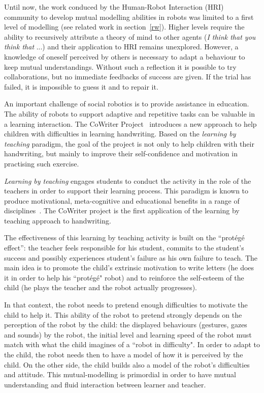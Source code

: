 \documentclass[conference]{IEEEtran}
\begin{document}
Until now, the work conduced by the Human-Robot Interaction (HRI) community to develop mutual modelling abilities in robots was limited to a first level of modelling (see related work in section~\ref{rw}). Higher levels require the ability to recursively attribute a theory of mind to other agents (\textit{I think that you think that} ...) and their application to HRI remains unexplored. However, a knowledge of oneself perceived by others is necessary to adapt a behaviour to keep mutual understandings. 
Without such a reflection it is possible to try collaborations, but no immediate feedbacks of success are given. If the trial has failed, it is impossible to guess it and to repair it. 


An important challenge of social robotics is to provide assistance in education. 
The ability of robots to support adaptive and repetitive tasks can be valuable in a learning interaction.
The CoWriter Project~\cite{Hood,jacq2016building} introduces a new approach to help children with difficulties in learning handwriting. 
Based on the \emph{learning by teaching} paradigm, the goal of the project is not only to help children with their handwriting, but mainly to improve their self-confidence and motivation in practising such exercise.

\emph{Learning by teaching} engages students to conduct the activity in the role of the teachers in order to support their learning process. 
This  paradigm is known to produce motivational, meta-cognitive and educational benefits in a range of disciplines~\cite{Rohrbeck2003}. 
The CoWriter project is the first application of the learning by teaching approach to handwriting.

The effectiveness of this learning by teaching activity is built on the ``prot\'eg\'e effect'': the teacher feels responsible for his student, commits to the student's success and possibly experiences student's failure as his own failure to teach. 
The main idea is to promote the child's extrinsic motivation to write letters (he does it in order to help his ``prot\'eg\'e" robot) and to reinforce the self-esteem of the child (he plays the teacher and the robot actually progresses).

In that context, the robot needs to pretend enough difficulties to motivate the child to help it. 
This ability of the robot to pretend strongly depends on the perception of the robot by the child: the displayed behaviours (gestures, gazes and sounds) by the robot, the initial level and learning speed of the robot must match with what the child imagines of a ``robot in difficulty".
In order to adapt to the child, the robot needs then to have a model of how it is perceived by the child. On the other side, the child builds also a model of the robot's difficulties and attitude. 
This mutual-modelling is primordial in order to have mutual understanding and fluid interaction between learner and teacher. 
\end{document}
